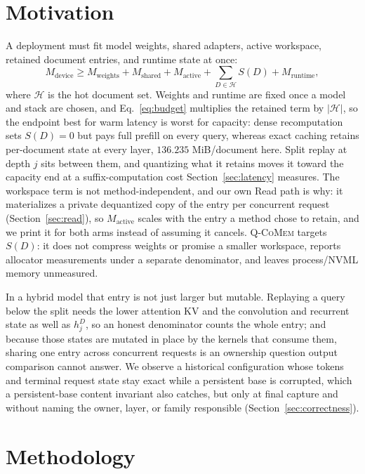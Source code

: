 \documentclass{article}
\newcommand{\qcomem}{\textsc{Q-CoMem}}
\begin{document}
\section{Motivation}
\label{sec:motivation}

A deployment must fit model weights, shared adapters, active workspace, retained
document entries, and runtime state at once:
\begin{equation}
 M_{\mathrm{device}} \geq M_{\mathrm{weights}}+M_{\mathrm{shared}}
 +M_{\mathrm{active}}+\sum_{D\in\mathcal{H}}S(D)+M_{\mathrm{runtime}},
 \label{eq:budget}
\end{equation}
where $\mathcal{H}$ is the hot document set. Weights and runtime are fixed once a
model and stack are chosen, and Eq.~\ref{eq:budget} multiplies the retained term
by $|\mathcal{H}|$, so the endpoint best for warm latency is worst for capacity:
dense recomputation sets $S(D)=0$ but pays full prefill on every query, whereas
exact caching retains per-document state at every layer, $136.235$ MiB/document
here.  Split replay at depth $j$ sits between them, and quantizing what it
retains moves it toward the capacity end at a suffix-computation cost
Section~\ref{sec:latency} measures.  The workspace term is not
method-independent, and our own Read path is why: it materializes a private
dequantized copy of the entry per concurrent request (Section~\ref{sec:read}), so
$M_{\mathrm{active}}$ scales with the entry a method chose to retain, and we
print it for both arms instead of assuming it cancels.  \qcomem{} targets
$S(D)$: it does not compress weights or promise a smaller workspace, reports
allocator measurements under a separate denominator, and leaves process/NVML
memory unmeasured.

In a hybrid model that entry is not just larger but mutable.  Replaying a query
below the split needs the lower attention KV and the convolution and recurrent
state as well as $h_j^D$, so an honest denominator counts the whole entry; and
because those states are mutated in place by the kernels that consume them,
sharing one entry across concurrent requests is an ownership question output
comparison cannot answer.  We observe a historical configuration whose tokens and
terminal request state stay exact while a persistent base is corrupted, which a
persistent-base content invariant also catches, but only at final capture and
without naming the owner, layer, or family responsible
(Section~\ref{sec:correctness}).

\section{Methodology}
\label{sec:method}
\end{document}
